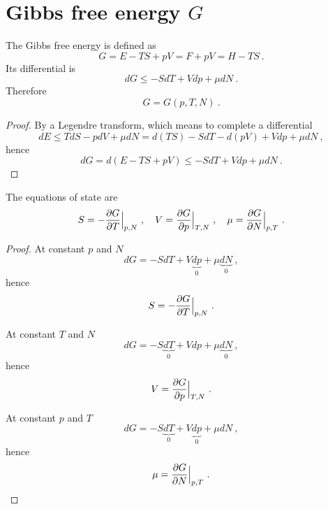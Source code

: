 \section{Gibbs free energy $G$} 

    The Gibbs free energy is defined as 
    \begin{equation*}
        G = E - TS + pV = F + pV = H - TS ~.
    \end{equation*}
    Its differential is 
    \begin{equation*}
        dG \leq - SdT + Vdp + \mu dN ~.
    \end{equation*}
    Therefore
    \begin{equation*}
        G = G(p, T, N) ~.
    \end{equation*}
    \begin{proof}
        By a Legendre transform, which means to complete a differential
        \begin{equation*}
            dE \leq T dS - p dV + \mu dN = d(TS) - S dT - d(pV) + V dp + \mu dN ~,
        \end{equation*}
        hence 
        \begin{equation*}
            dG = d(E - TS + pV) \leq - S dT + Vdp + \mu dN ~.
        \end{equation*}
    \end{proof}

    The equations of state are
    \begin{equation}
        S = - \frac{\partial G}{\partial T} \Big \vert_{p,N} ~, \quad V = \frac{\partial G}{\partial p} \Big \vert_{T,N} ~, \quad \mu = \frac{\partial G}{\partial N} \Big \vert_{p,T} ~. 
    \end{equation}
    \begin{proof}
        At constant $p$ and $N$
        \begin{equation*}
            dG = - S dT + V\underbrace{dp }_0 + \mu \underbrace{dN}_0  ~,
        \end{equation*}
        hence 
        \begin{equation*}
            S = - \frac{\partial G}{\partial T} \Big \vert_{p,N}  ~.
        \end{equation*}

        At constant $T$ and $N$
        \begin{equation*}
            dG = - S \underbrace{dT}_0  + Vdp + \mu \underbrace{dN}_0  ~,
        \end{equation*}
        hence 
        \begin{equation*}
            V = \frac{\partial G}{\partial p} \Big \vert_{T,N} ~.
        \end{equation*}

        At constant $p$ and $T$
        \begin{equation*}
            dG = - S \underbrace{dT}_0  + V\underbrace{dp}_0  + \mu dN ~,
        \end{equation*}
        hence 
        \begin{equation*}
            \mu = \frac{\partial G}{\partial N} \Big \vert_{p,T} ~.
        \end{equation*}
    \end{proof}

